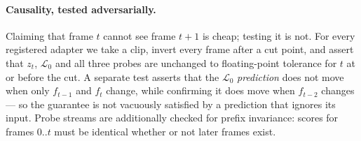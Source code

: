 \paragraph{Causality, tested adversarially.} Claiming that frame $t$ cannot see
frame $t{+}1$ is cheap; testing it is not. For every registered adapter we take
a clip, invert every frame after a cut point, and assert that $z_t$,
$\mathcal{L}_0$ and all three probes are unchanged to floating-point tolerance
for $t$ at or before the cut. A separate test asserts that the $\mathcal{L}_0$
\emph{prediction} does not move when only $f_{t-1}$ and $f_t$ change, while
confirming it does move when $f_{t-2}$ changes --- so the guarantee is not
vacuously satisfied by a prediction that ignores its input. Probe streams are
additionally checked for prefix invariance: scores for frames $0..t$ must be
identical whether or not later frames exist.
